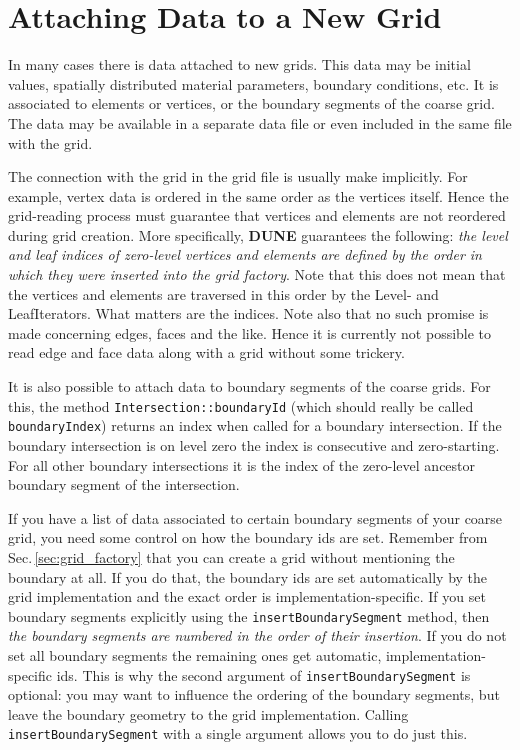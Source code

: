 \documentclass[11pt,a4paper,headinclude,footinclude,DIV16,normalheadings]{scrreprt}
\newcommand{\Dune}{{\sf\bfseries DUNE}\xspace}
\begin{document}
\section{Attaching Data to a New Grid}
\label{sec:import_data_for_new_grids}

In many cases there is data attached to new grids.  This data may be initial
values, spatially distributed material parameters, boundary conditions, etc.
It is associated to elements or vertices, or the boundary segments of the
coarse grid.  The data may be available in a separate data file or even
included in the same file with the grid. 

 The connection with the grid in
the grid file is usually make implicitly.  For example, vertex data is ordered
in the same order as the vertices itself.  Hence the grid-reading process must 
guarantee that vertices and elements are not reordered during grid creation.
More specifically, \Dune guarantees the following: {\em the level and leaf
indices of zero-level vertices and elements are defined by the order in which they
were inserted into the grid factory}.  Note that this does not mean that
the vertices and elements are traversed in this order by the Level- and
LeafIterators.  What matters are the indices.  Note also that no such
promise is made concerning edges, faces and the like.  Hence it is currently
not possible to read edge and face data along with a grid without some
trickery.

It is also possible to attach data to boundary segments of the coarse grids.
For this, the method \lstinline!Intersection::boundaryId! (which should
really be called \lstinline!boundaryIndex!) returns an index when called
for a boundary intersection.  If the boundary intersection is on level zero
the index is consecutive and zero-starting.  For all other boundary intersections
it is the index of the zero-level ancestor boundary segment of the intersection.

If you have a list of data associated to certain boundary segments of your
coarse grid, you need some control on how the boundary ids are set.  Remember
from Sec.\,\ref{sec:grid_factory} that you can create a grid without mentioning
the boundary at all.  If you do that, the boundary ids are set automatically
by the grid implementation and the exact order is implementation-specific.
If you set boundary segments explicitly using the \lstinline!insertBoundarySegment!
method, then {\em the boundary segments are numbered in the order of their
insertion}.  If you do not set all boundary segments the remaining ones
get automatic, implementation-specific ids.  This is why the second argument
of \lstinline!insertBoundarySegment! is optional: you may want to
influence the ordering of the boundary segments, but leave the boundary
geometry to the grid implementation.  Calling \lstinline!insertBoundarySegment!
with a single argument allows you to do just this.
\end{document}
